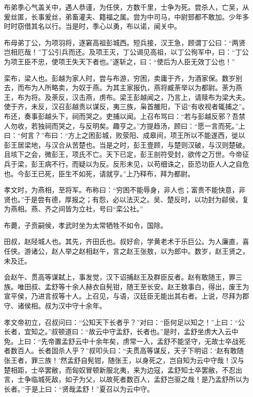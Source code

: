 \documentclass[]{article}
\begin{document}
布弟季心气盖关中，遇人恭谨，为任侠，方数千里，士争为死。尝杀人，亡吴，从爰丝匿，长事爰丝，弟畜灌夫、籍福之属。尝为中司马，中尉郅都不敢加。少年多时时窃借其名以行。当是时，季心以勇，布以诺，闻关中。

布母弟丁公，为项羽将，逐窘高祖彭城西。短兵接，汉王急，顾谓丁公曰：``两贤岂相厄哉！''丁公引兵而还。及项王灭，丁公谒见高祖，以丁公徇军中，曰：``丁公为项王臣不忠，使项王失天下者也。''遂斩之，曰：``使后为人臣无效丁公也！''

栾布，梁人也。彭越为家人时，尝与布游，穷困，卖庸于齐，为酒家保。数岁别去，而布为人所略卖，为奴于燕。为其主家报仇，燕将臧荼举以为都尉。荼为燕王，布为将。及荼反，汉击燕，虏布。梁王彭越闻之，乃言上，请赎布为梁大夫。使于齐，未反，汉召彭越责以谋反，夷三族，枭首雒阳，下诏``有收视者辄捕之''。布还，奏事彭越头下，祠而哭之。吏捕以闻。上召布骂曰：``若与彭越反邪？吾禁人勿收，若独祠而哭之，与反明矣。趣亨之。''方提趋汤，顾曰：``愿一言而死。''上曰：``何言？''布曰：``方上之困彭城，败荥阳、成皋间，项王所以不能遂西，徙以彭王居梁地，与汉合从苦楚也。当是之时，彭王壹顾，与楚则汉破，与汉则楚破。且垓下之会，微彭王，项氏不亡。天下已定，彭王剖符受封，欲传之万世。今帝征兵于梁，彭王病不行，而疑以为反。反形未见，以苟细诛之，臣恐功臣人人之自危也。今彭王已死，臣生不如死，请就亨。''上乃释布，拜为都尉。

孝文时，为燕相，至将军。布称曰：``穷困不能辱身，非人也；富贵不能快意，非贤也。''于是尝有德，厚报之；有怨，必以法灭之。吴、楚反时，以功封为鄃侯，复为燕相。燕、齐之间皆为立社，号曰``栾公社。''

布薨，子贲嗣侯，孝武时坐为太常牺牲不如令，国除。

田叔，赵陉城人也。其先，齐田氏也。叔好俞，学黄老术于乐巨公。为人廉直，喜任侠。游诸公，赵人举之赵相赵午，言之赵王张敖，以为郎中。数岁，赵王贤之，未及迁。

会赵午、贯高等谋弑上，事发觉，汉下诏捕赵王及群臣反者。赵有敢随王，罪三族。唯田叔、孟舒等十余人赫衣自髡钳，随王至长安。赵王敖事白，得出，废王为宣平侯，乃进言叔等十人。上召见，与语，汉廷臣无能出其右者。上说，尽拜为郡守、诸侯相。叔为汉中守十余年。

孝文帝初立，召叔问曰：``公知天下长者乎？''对曰：``臣何足以知之！''上曰：``公长者，宜知之。''叔顿道曰：``故云中守孟舒，长者也。''是时，孟舒坐虏大入云中免。上曰：``先帝置孟舒云中十余年矣，虏常一入，孟舒不能坚守，无故士卒战死者数百人。长者固杀人乎？''叔叩头曰：``夫贯高等谋反，天子下明诏：`赵有敢随张王者，罪三族！'然孟舒自髡钳，随张王，以身死之，岂自知为云中守哉！汉与楚相距，士卒罢敝，而匈奴冒顿新服北夷，来为边寇，孟舒知士卒罢敝，不忍出言，士争临城死敌，如子为父，以故死者数百人，孟舒岂驱之哉！是乃孟舒所以为长者。''于是上曰：``贤哉孟舒！''夏召以为云中守。
\end{document}
